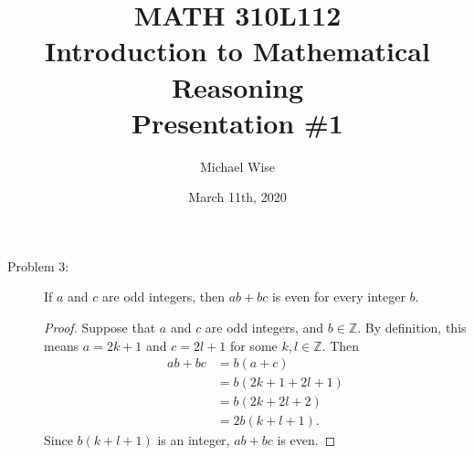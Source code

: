 \documentclass[12pt]{article}
\title{MATH 310L112\\
       Introduction to Mathematical Reasoning\\
       Presentation \#1}
\author{Michael Wise}
\date{March 11th, 2020}
\begin{document}
\maketitle
\begin{description}

\item[Problem 3:] If $a$ and $c$ are odd integers, then $ab + bc$ is even for every integer $b$.

\begin{spacing}{2}
\begin{proof}
Suppose that $a$ and $c$ are odd integers, and $b \in \mathbb{Z}$. By definition, this means $a=2k+1$ and $c=2l+1$ for some $k,l \in \mathbb{Z}$. Then
\begin{align*}
ab + bc &= b(a+c) \\
&= b(2k+1 + 2l+1) \\
&= b(2k+2l+2) \\
&= 2b(k+l+1).
\end{align*}
Since $b(k+l+1)$ is an integer, $ab+bc$ is even.
\end{proof}
\end{spacing}
\end{description}
%
\newpage
{}
%
\end{document}
